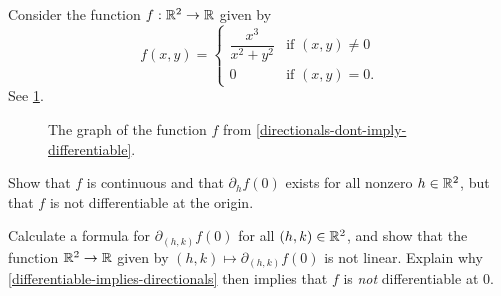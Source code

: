 \begin{exercise} \label{directionals-dont-imply-differentiable}
	Consider the function $f : \mathbb{R}^2 \to \mathbb{R}$ given by
	\[ f(x,y) = \begin{cases} \dfrac{x^3}{x^2 +y^2} & \text{if } (x, y) \neq 0 \\ 0 & \text{if } (x,y) = 0. \end{cases} \]
	See \cref{directionals-dont-imply-differentiable-graph}.
	\begin{figure}[ht]
		\begin{center}
		\end{center}
		\caption{The graph of the function  $f$ from \cref{directionals-dont-imply-differentiable}.} \label{directionals-dont-imply-differentiable-graph}
	\end{figure} 
	Show that $f$ is continuous and that $\partial_h f(0)$ exists for all nonzero $h \in \mathbb{R}^2$, but that $f$ is not differentiable at the origin. 
	\begin{hint}
		Calculate a formula for $\partial_{(h,k)} f(0)$ for all $(h,k) \in \mathbb{R}^2$, and show that the function $\mathbb{R}^2 \to \mathbb{R}$ given by $(h,k) \mapsto \partial_{(h,k)} f(0)$ is not linear. Explain why \cref{differentiable-implies-directionals} then implies that $f$ is \emph{not} differentiable at 0.  
	\end{hint}
\end{exercise}

